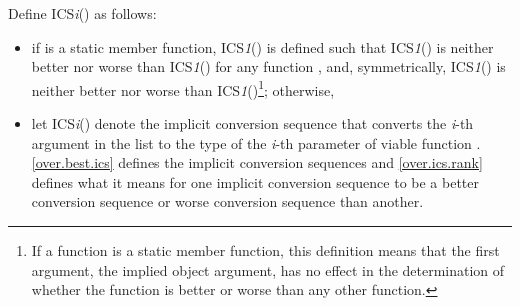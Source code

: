 \pnum
{}%
Define ICS\textit{i}() as follows:

\begin{itemize}
\item
if
is a static member function, ICS\textit{1}() is defined such that
ICS\textit{1}() is neither better nor worse than ICS\textit{1}()
for any function
,
and, symmetrically, ICS\textit{1}() is neither better nor worse than
ICS\textit{1}()\footnote{If a function is a static member function, this
definition means that the first argument, the implied object argument,
has no effect in the determination of whether the function is better
or worse than any other function.};
otherwise,
\item
let ICS\textit{i}() denote the implicit conversion sequence that converts
the \textit{i}-th argument in the list to the type of the
\textit{i}-th
parameter
of viable function
.
\ref{over.best.ics} defines the implicit conversion sequences and \ref{over.ics.rank}
defines what it means for one implicit conversion sequence to be
a better conversion sequence or worse conversion sequence than
another.
\end{itemize}

